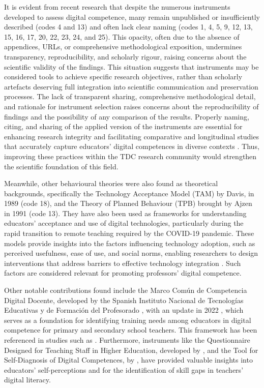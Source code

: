 \documentclass[english]{textolivre}
\begin{document}
It is evident from recent research that despite the numerous instruments developed to assess digital competence, many remain unpublished or insufficiently described (codes 4 and 13) and often lack clear naming (codes 1, 4, 5, 9, 12, 13, 15, 16, 17, 20, 22, 23, 24, and 25). This opacity, often due to the absence of appendices, URLs, or comprehensive methodological exposition, undermines transparency, reproducibility, and scholarly rigour, raising concerns about the scientific validity of the findings. This situation suggests that instruments may be considered tools to achieve specific research objectives, rather than scholarly artefacts deserving full integration into scientific communication and preservation processes. The lack of transparent sharing, comprehensive methodological detail, and rationale for instrument selection raises concerns about the reproducibility of findings and the possibility of any comparison of the results. Properly naming, citing, and sharing of the applied version of the instruments are essential for enhancing research integrity and facilitating comparative and longitudinal studies that accurately capture educators’ digital competences in diverse contexts \cite{Creswell2021}. Thus, improving these practices within the TDC research community would strengthen the scientific foundation of this field.

Meanwhile, other behavioural theories were also found as theoretical backgrounds, specifically the Technology Acceptance Model (TAM) by Davis, in 1989 (code 18), and the Theory of Planned Behaviour (TPB) brought by Ajzen in 1991 (code 13). They have also been used as frameworks for understanding educators’ acceptance and use of digital technologies, particularly during the rapid transition to remote teaching required by the COVID-19 pandemic. These models provide insights into the factors influencing technology adoption, such as perceived usefulness, ease of use, and social norms, enabling researchers to design interventions that address barriers to effective technology integration \cite{mashroofa2020moderating,palaciosrodriguez2022production}. Such factors are considered relevant for promoting professors’ digital competence.

Other notable contributions found include the Marco Común de Competencia Digital Docente, developed by the Spanish Instituto Nacional de Tecnologías Educativas y de Formación del Profesorado \cite{INTEF2017}, with an update in 2022 \cite{INTEF2022}, which serves as a foundation for identifying training needs among educators in digital competence for primary and secondary school teachers. This framework has been referenced in studies such as \textcite{perezlopez2023teachers}. Furthermore, instruments like the Questionnaire Designed for Teaching Staff in Higher Education, developed by \textcite{taquez2017diseno}, and the Tool for Self-Diagnosis of Digital Competences, by \textcite{lopez2019liderazgo}, have provided valuable insights into educators’ self-perceptions and for the identification of skill gaps in teachers’ digital literacy.
\end{document}
